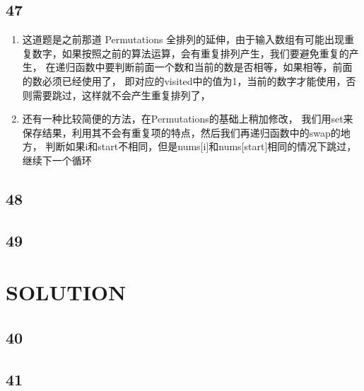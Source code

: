 \documentclass[12pt,a4paper]{article}
\begin{document}
\subsection{47}
\begin{enumerate}
\item
\begin{CJK}{UTF8}{gbsn}
这道题是之前那道 Permutations 全排列的延伸，由于输入数组有可能出现重复数字，如果按照之前的算法运算，会有重复排列产生，我们要避免重复的产生，
在递归函数中要判断前面一个数和当前的数是否相等，如果相等，前面的数必须已经使用了，
即对应的visited中的值为1，当前的数字才能使用，否则需要跳过，这样就不会产生重复排列了，
\end{CJK}
\item
\begin{CJK}{UTF8}{gbsn}
还有一种比较简便的方法，在Permutations的基础上稍加修改，
我们用set来保存结果，利用其不会有重复项的特点，然后我们再递归函数中的swap的地方，
判断如果i和start不相同，但是nums[i]和nums[start]相同的情况下跳过，继续下一个循环
\end{CJK}
\end{enumerate}

\subsection{48}
\begin{CJK}{UTF8}{gbsn}

\end{CJK}

\subsection{49}

\section{SOLUTION}
\subsection{40}
\subsection{41}
\end{document}
